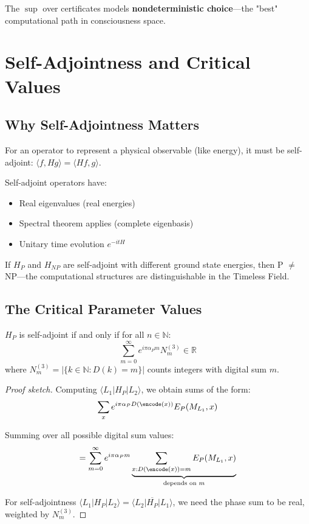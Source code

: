 The $\sup$ over certificates models \textbf{nondeterministic choice}—the "best" computational path in consciousness space.

\section{Self-Adjointness and Critical Values}

\subsection{Why Self-Adjointness Matters}

\begin{keyidea}
For an operator to represent a physical observable (like energy), it must be self-adjoint: $\langle f, Hg \rangle = \langle Hf, g \rangle$.

Self-adjoint operators have:
\begin{itemize}
\item Real eigenvalues (real energies)
\item Spectral theorem applies (complete eigenbasis)
\item Unitary time evolution $e^{-itH}$
\end{itemize}

If $H_P$ and $H_{NP}$ are self-adjoint with different ground state energies, then P $\neq$ NP—the computational structures are distinguishable in the Timeless Field.
\end{keyidea}

\subsection{The Critical Parameter Values}

\begin{theorem}\label{thm:self-adjoint-criterion}
$H_P$ is self-adjoint if and only if for all $n \in \mathbb{N}$:
\begin{equation}
\sum_{m=0}^{\infty} e^{i\pi\alpha_P m} N_m^{(3)} \in \mathbb{R}
\end{equation}
where $N_m^{(3)} = |\{k \in \mathbb{N} : D(k) = m\}|$ counts integers with digital sum $m$.
\end{theorem}

\begin{proof}[Proof sketch]
Computing $\langle L_1 | H_P | L_2 \rangle$, we obtain sums of the form:
\begin{equation}
\sum_{x} e^{i\pi\alpha_P D(\encode(x))} E_P(M_{L_1}, x)
\end{equation}

Summing over all possible digital sum values:
\begin{equation}
= \sum_{m=0}^{\infty} e^{i\pi\alpha_P m} \underbrace{\sum_{x: D(\encode(x)) = m} E_P(M_{L_1}, x)}_{\text{depends on } m}
\end{equation}

For self-adjointness $\langle L_1 | H_P | L_2 \rangle = \overline{\langle L_2 | H_P | L_1 \rangle}$, we need the phase sum to be real, weighted by $N_m^{(3)}$.
\end{proof}

